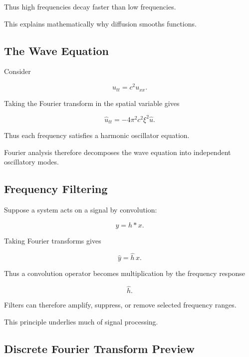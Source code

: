 Thus high frequencies decay faster than low frequencies.

This explains mathematically why diffusion smooths functions.

\subsection{The Wave Equation}
\label{subsec:fourier-wave-equation}

Consider

\[
\boxed{
u_{tt}
=
c^2u_{xx}.
}
\]

Taking the Fourier transform in the spatial variable gives

\[
\widehat{u}_{tt}
=
-4\pi^2c^2\xi^2\widehat{u}.
\]

Thus each frequency satisfies a harmonic oscillator equation.

Fourier analysis therefore decomposes the wave equation into independent
oscillatory modes.

\subsection{Frequency Filtering}
\label{subsec:frequency-filtering}

Suppose a system acts on a signal by convolution:

\[
y=h*x.
\]

Taking Fourier transforms gives

\[
\boxed{
\widehat{y}
=
\widehat{h}\,\widehat{x}.
}
\]

Thus a convolution operator becomes multiplication by the frequency
response

\[
\widehat{h}.
\]

Filters can therefore amplify, suppress, or remove selected frequency
ranges.

This principle underlies much of signal processing.

\subsection{Discrete Fourier Transform Preview}
\label{subsec:dft-preview}

